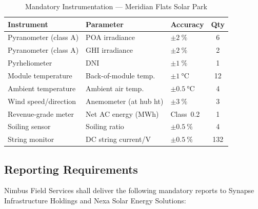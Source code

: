\begin{table}[H]
  \centering
  \caption{Mandatory Instrumentation — Meridian Flats Solar Park}
  \label{tab:instruments}
  \begin{tabular}{@{} l l l c @{}}
    \toprule
    \rowcolor{SolarMist}
    \textbf{Instrument} & \textbf{Parameter} & \textbf{Accuracy} & \textbf{Qty} \\
    \midrule
    Pyranometer (class A) & POA irradiance         & $\pm\SI{2}{\percent}$  & 6 \\
    Pyranometer (class A) & GHI irradiance         & $\pm\SI{2}{\percent}$  & 2 \\
    Pyrheliometer         & DNI                    & $\pm\SI{1}{\percent}$  & 1 \\
    Module temperature    & Back-of-module temp.   & $\pm\SI{1}{\celsius}$  & 12 \\
    Ambient temperature   & Ambient air temp.      & $\pm\SI{0.5}{\celsius}$ & 4 \\
    Wind speed/direction  & Anemometer (at hub ht) & $\pm\SI{3}{\percent}$  & 3 \\
    Revenue-grade meter   & Net AC energy (MWh)    & Class~0.2              & 1 \\
    Soiling sensor        & Soiling ratio          & $\pm\SI{0.5}{\percent}$ & 4 \\
    String monitor        & DC string current/V    & $\pm\SI{0.5}{\percent}$ & 132 \\
    \bottomrule
  \end{tabular}
\end{table}

\subsection{Reporting Requirements}

Nimbus Field Services shall deliver the following mandatory reports to Synapse Infrastructure
Holdings and Nexa Solar Energy Solutions:

